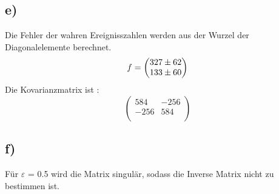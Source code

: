 \subsection*{e)}
Die Fehler der wahren Ereignisszahlen werden aus der Wurzel der Diagonalelemente berechnet.
\begin{equation}
  f = \begin{pmatrix}
    \num{327 +- 62}\\
    \num{133 +- 60}\\
    \end{pmatrix}
\end{equation}
Die Kovarianzmatrix ist :
\begin{equation}
  \begin{pmatrix}
    584 & -256 \\
    -256 & 584 \\
  \end{pmatrix}
\end{equation}

\subsection*{f)}
Für $\varepsilon$ = 0.5 wird die Matrix singulär, sodass die Inverse Matrix nicht zu bestimmen ist.
